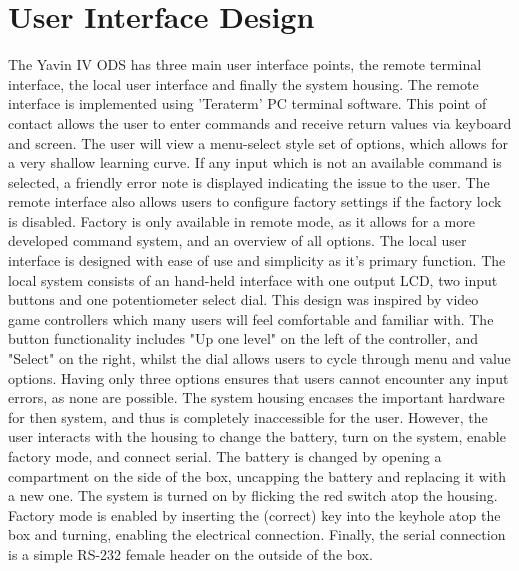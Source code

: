 \documentclass[]{report}
\begin{document}
\chapter{User Interface Design}
The Yavin IV ODS has three main user interface points, the remote terminal interface, the local user interface and finally the system housing.\newline
The remote interface is implemented using 'Teraterm' PC terminal software. This point of contact allows the user to enter commands and receive return values via keyboard and screen. The user will view a menu-select style set of options, which allows for a very shallow learning curve. If any input which is not an available command is selected, a friendly error note is displayed indicating the issue to the user. \newline
The remote interface also allows users to configure factory settings if the factory lock is disabled. Factory is only available in remote mode, as it allows for a more developed command system, and an overview of all options. \newline
The local user interface is designed with ease of use and simplicity as it's primary function. The local system consists of an hand-held interface with one output LCD, two input buttons and one potentiometer select dial. This design was inspired by video game controllers which many users will feel comfortable and familiar with.\newline
The button functionality includes "Up one level" on the left of the controller, and "Select" on the right, whilst the dial allows users to cycle through menu and value options. Having only three options ensures that users cannot encounter any input errors, as none are possible.\newline
The system housing encases the important hardware for then system, and thus is completely inaccessible for the user. However, the user interacts with the housing to change the battery, turn on the system, enable factory mode, and connect serial. The battery is changed by opening a compartment on the side of the box, uncapping the battery and replacing it with a new one. The system is turned on by flicking the red switch atop the housing. Factory mode is enabled by inserting the (correct) key into the keyhole atop the box and turning, enabling the electrical connection. Finally, the serial connection is a simple RS-232 female header on the outside of the box.\newline
\end{document}

